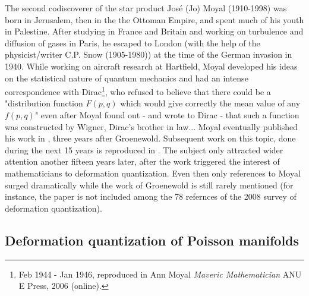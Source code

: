 \documentclass[12pt]{article}
\begin{document}
{The second codiscoverer of the star product Jos\'e (Jo) Moyal (1910-1998) was born in Jerusalem, then in the the Ottoman Empire, and spent much of his youth in Palestine. After studying in France and Britain and working on turbulence and diffusion of gases in Paris, he escaped to London (with the help of the physicist/writer C.P. Snow (1905-1980)) at 
the time of the German invasion in 1940. While working on aircraft research at Hartfield, Moyal developed his ideas on the statistical nature of quantum mechanics and had an intense correspondence with Dirac\footnote{Feb 1944 - Jan 1946, reproduced in Ann Moyal {\it Maveric Mathematician} ANU E Press, 2006 (online).}, who refused to believe that there could be a "distribution function $F(p, q)$ which would give correctly the mean value of any $f(p, q)$" even after Moyal found out - and wrote to Dirac - that such a function was constructed by Wigner, Dirac's brother in law... Moyal eventually published his work in \cite{M49}, three years after Groenewold. Subsequent work on this topic, done during the next 15 years is reproduced in \cite{ZFC}. The subject only attracted wider attention another fifteen years later, after the work \cite{BFLS} triggered the interest of mathematicians to deformation quantization. Even then only references to Moyal surged dramatically while the work of Groenewold is still rarely mentioned (for instance, the paper \cite{G46} is not included among the 78 refernces of the 2008 survey \cite{B08} of deformation quantization).}

 \smallskip
 
\subsection{Deformation quantization of Poisson manifolds}
\end{document}
